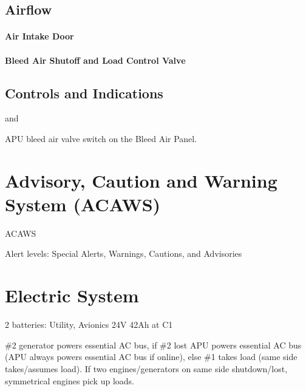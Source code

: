 \subsection{Airflow}

\paragraph*{Air Intake Door}
\label{par:air-intake-door}

\paragraph*{Bleed Air Shutoff and Load Control Valve}
\label{par:bleed-air-shutoff-and-load-control-valve}

\subsection{Controls and Indications}

 and 




APU bleed air valve switch on the Bleed Air Panel.

\section{Advisory, Caution and Warning System (ACAWS)}
\label{sec:acaws}

\gls{ACAWS}

Alert levels: Special Alerts, Warnings, Cautions, and Advisories

\section{Electric System}

2 batteries: Utility, Avionics 24V 42Ah at C1

\#2 generator powers essential AC bus, if \#2 lost APU powers essential AC bus (APU always powers essential AC bus if online), else \#1 takes load (same side takes/assumes load). If two engines/generators on same side shutdown/lost, symmetrical engines pick up loads.

